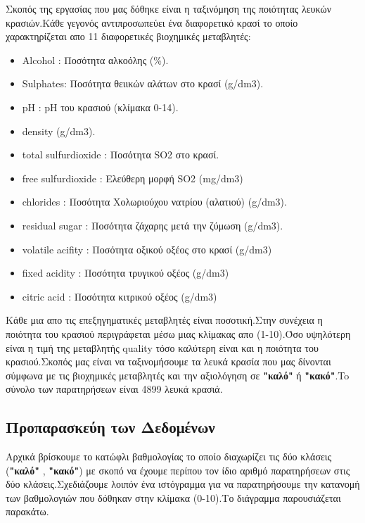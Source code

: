 \documentclass[12pt,a4paper]{article}
\begin{document}
Σκοπός της εργασίας που μας δόθηκε είναι η ταξινόμηση της ποιότητας λευκών κρασιών.Κάθε γεγονός αντιπροσωπεύει ένα διαφορετικό κρασί το οποίο χαρακτηρίζεται απο 11 διαφορετικές βιοχημικές μεταβλητές:
\begin{itemize}
\item Alcohol : Ποσότητα αλκοόλης (\%).
\item Sulphates: Ποσότητα θειικών αλάτων στο κρασί (g/dm3).
\item pH : pH του κρασιού (κλίμακα 0-14).
\item density (g/dm3).
\item total sulfurdioxide : Ποσότητα SO2 στο κρασί.
\item free sulfurdioxide : Ελεύθερη μορφή SO2 (mg/dm3)
\item chlorides : Ποσότητα Χολωριούχου νατρίου (αλατιού) (g/dm3).
\item residual sugar : Ποσότητα ζάχαρης μετά την ζύμωση (g/dm3).
\item volatile acifity : Ποσότητα οξικού οξέος στο κρασί (g/dm3)
\item fixed acidity : Ποσότητα τρυγικού οξέος (g/dm3)
\item citric acid : Ποσότητα κιτρικού οξέος (g/dm3)
\end{itemize}
Κάθε μια απο τις επεξηγηματικές μεταβλητές είναι ποσοτική.Στην συνέχεια η ποιότητα του κρασιού περιγράφεται μέσω μιας κλίμακας απο (1-10).Όσο υψηλότερη είναι η τιμή της μεταβλητής quality τόσο καλύτερη είναι και η ποιότητα του κρασιού.Σκοπός μας είναι να ταξινομήσουμε τα λευκά κρασία που μας δίνονται σύμφωνα με τις βιοχημικές μεταβλητές και την αξιολόγηση σε \textbf{"καλό"} ή \textbf{"κακό"}.To σύνολο των παρατηρήσεων είναι 4899 λευκά κρασιά.

\par
\subsection{Προπαρασκεύη των Δεδομένων}
Αρχικά βρίσκουμε το κατώφλι βαθμολογίας το οποίο διαχωρίζει τις δύο κλάσεις (\textbf{"καλό"} , \textbf{"κακό"}) με σκοπό να έχουμε περίπου τον ίδιο αριθμό παρατηρήσεων στις δύο κλάσεις.Σχεδιάζουμε λοιπόν ένα ιστόγραμμα για να παρατηρήσουμε την κατανομή των βαθμολογιών που δόθηκαν στην κλίμακα (0-10).Το διάγραμμα παρουσιάζεται παρακάτω.
\end{document}
